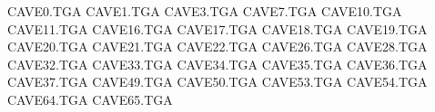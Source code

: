 CAVE0.TGA
CAVE1.TGA
CAVE3.TGA
CAVE7.TGA
CAVE10.TGA
CAVE11.TGA
CAVE16.TGA
CAVE17.TGA
CAVE18.TGA
CAVE19.TGA
CAVE20.TGA
CAVE21.TGA
CAVE22.TGA
CAVE26.TGA
CAVE28.TGA
CAVE32.TGA
CAVE33.TGA
CAVE34.TGA
CAVE35.TGA
CAVE36.TGA
CAVE37.TGA
CAVE49.TGA
CAVE50.TGA
CAVE53.TGA
CAVE54.TGA
CAVE64.TGA
CAVE65.TGA